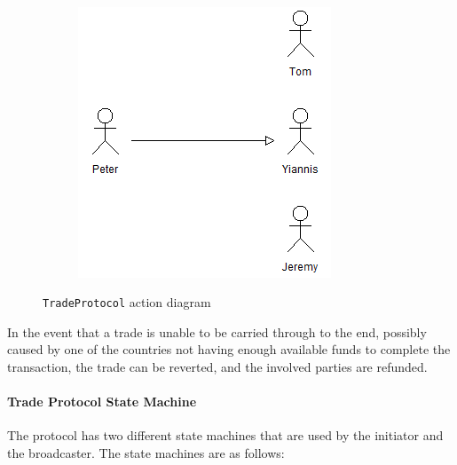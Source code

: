\begin{figure}[h!]
\begin{subfigure}[b]{0.3\textwidth}
				\caption{}
				\label{subfig:protocol2}
        \end{subfigure}
        ~ %
        \begin{subfigure}[b]{0.3\textwidth}
                \centering
                \includegraphics[width=\textwidth]{img/protocol3.png}
				\caption{}
				\label{subfig:protocol3}
        \end{subfigure}
        \caption{\texttt{TradeProtocol} action diagram}\label{fig:protocol}
\end{figure}

In the event that a trade is unable to be carried through to the end, possibly caused by one of the countries not having enough available funds to complete the transaction, the trade can be reverted, and the involved parties are refunded.

\paragraph{Trade Protocol State Machine}

The protocol has two different state machines that are used by the initiator and the broadcaster. The state machines are as follows: 


